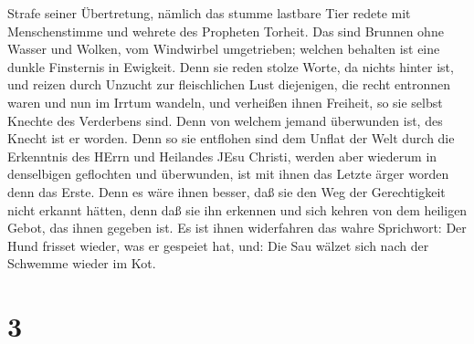 Strafe seiner Übertretung, nämlich das stumme lastbare Tier redete mit
Menschenstimme und wehrete des Propheten Torheit.  Das sind
Brunnen ohne Wasser und Wolken, vom Windwirbel umgetrieben; welchen
behalten ist eine dunkle Finsternis in Ewigkeit.  Denn sie
reden stolze Worte, da nichts hinter ist, und reizen durch Unzucht zur
fleischlichen Lust diejenigen, die recht entronnen waren und nun im
Irrtum wandeln,  und verheißen ihnen Freiheit, so sie
selbst Knechte des Verderbens sind. Denn von welchem jemand überwunden
ist, des Knecht ist er worden.  Denn so sie entflohen sind
dem Unflat der Welt durch die Erkenntnis des HErrn und Heilandes JEsu
Christi, werden aber wiederum in denselbigen geflochten und überwunden,
ist mit ihnen das Letzte ärger worden denn das Erste.  Denn
es wäre ihnen besser, daß sie den Weg der Gerechtigkeit nicht erkannt
hätten, denn daß sie ihn erkennen und sich kehren von dem heiligen
Gebot, das ihnen gegeben ist.  Es ist ihnen widerfahren das
wahre Sprichwort: Der Hund frisset wieder, was er gespeiet hat, und: Die
Sau wälzet sich nach der Schwemme wieder im Kot.

\hypertarget{section-2}{%
\section{3}\label{section-2}}

